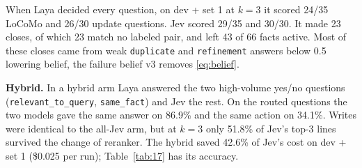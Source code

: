 \documentclass[11pt]{article}
\newcommand{\src}[1]{}
\begin{document}
When Laya decided every question, on dev + set 1 at $k{=}$3 it scored 24/35\src{bench/results/e4\_belief\_v2\_laya\_\_dev\_updates\_\_k3.json} LoCoMo and 26/30\src{bench/results/e4\_belief\_v2\_laya\_\_dev\_updates\_\_k3.json} update questions. Jev scored 29/35\src{bench/results/e4\_belief\_v2\_shadow\_\_dev\_updates\_\_k3.json} and 30/30\src{bench/results/e4\_belief\_v2\_shadow\_\_dev\_updates\_\_k3.json}. It made 23\src{bench/results/e4\_belief\_v2\_laya\_\_dev\_updates\_\_k3.json} closes, of which 23\src{bench/results/e4\_belief\_v2\_laya\_\_dev\_updates\_\_k3.json} match no labeled pair, and left 43\src{bench/results/e4\_belief\_v2\_laya\_\_dev\_updates\_\_k3.json} of 66\src{bench/results/e4\_belief\_v2\_laya\_\_dev\_updates\_\_k3.json} facts active. Most of these closes came from weak \texttt{duplicate} and \texttt{refinement} answers below 0.5 lowering belief, the failure belief v3 removes \cref{eq:belief}.

\textbf{Hybrid.} In a hybrid arm Laya answered the two high-volume yes/no questions (\texttt{relevant\_\allowbreak{}to\_\allowbreak{}query}, \texttt{same\_\allowbreak{}fact}) and Jev the rest. On the routed questions the two models gave the same answer on 86.9\%\src{bench/results/hybrid\_report.json} and the same action on 34.1\%\src{bench/results/hybrid\_report.json}. Writes were identical to the all-Jev arm, but at $k{=}$3 only 51.8\%\src{bench/results/hybrid\_report.json} of Jev's top-3 lines survived the change of reranker. The hybrid saved 42.6\%\src{bench/results/hybrid\_report.json} of Jev's cost on dev + set 1 (\$0.025\src{bench/results/hybrid\_report.json} per run); Table~\ref{tab:17} has its accuracy.
\end{document}
